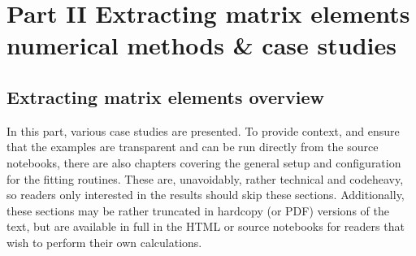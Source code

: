 \documentclass[letterpaper,table,10pt,english]{jupyterBook}
\begin{document}
\sphinxstepscope


\part{Part II \sphinxhyphen{} Extracting matrix elements \sphinxhyphen{} numerical methods \& case studies}

\sphinxstepscope


\chapter{Extracting matrix elements overview}
\label{\detokenize{part2/extracting_matrix_elements_overview_270423:extracting-matrix-elements-overview}}\label{\detokenize{part2/extracting_matrix_elements_overview_270423:chpt-extracting-matrix-elements-overview}}\label{\detokenize{part2/extracting_matrix_elements_overview_270423::doc}}
\sphinxAtStartPar
In this part, various case studies are presented. To provide context, and ensure that the examples are transparent and can be run directly from the source notebooks, there are also chapters covering the general setup and configuration for the fitting routines. These are, unavoidably, rather technical and code\sphinxhyphen{}heavy, so readers only interested in the results should skip these sections. Additionally, these sections may be rather truncated in hard\sphinxhyphen{}copy (or PDF) versions of the text, but are available in full in the HTML or source notebooks for readers that wish to perform their own calculations.
\end{document}
